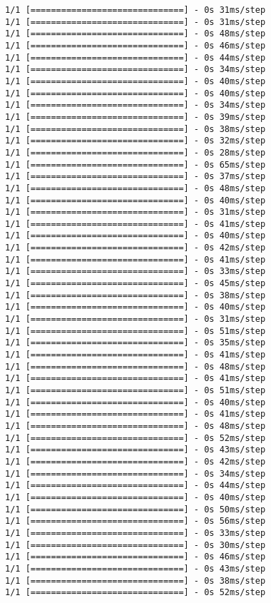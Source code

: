 \documentclass[11pt]{article}
\begin{document}
\begin{Verbatim}[commandchars=\\\{\}]
1/1 [==============================] - 0s 31ms/step
1/1 [==============================] - 0s 31ms/step
1/1 [==============================] - 0s 48ms/step
1/1 [==============================] - 0s 46ms/step
1/1 [==============================] - 0s 44ms/step
1/1 [==============================] - 0s 34ms/step
1/1 [==============================] - 0s 40ms/step
1/1 [==============================] - 0s 40ms/step
1/1 [==============================] - 0s 34ms/step
1/1 [==============================] - 0s 39ms/step
1/1 [==============================] - 0s 38ms/step
1/1 [==============================] - 0s 32ms/step
1/1 [==============================] - 0s 28ms/step
1/1 [==============================] - 0s 65ms/step
1/1 [==============================] - 0s 37ms/step
1/1 [==============================] - 0s 48ms/step
1/1 [==============================] - 0s 40ms/step
1/1 [==============================] - 0s 31ms/step
1/1 [==============================] - 0s 41ms/step
1/1 [==============================] - 0s 40ms/step
1/1 [==============================] - 0s 42ms/step
1/1 [==============================] - 0s 41ms/step
1/1 [==============================] - 0s 33ms/step
1/1 [==============================] - 0s 45ms/step
1/1 [==============================] - 0s 38ms/step
1/1 [==============================] - 0s 40ms/step
1/1 [==============================] - 0s 31ms/step
1/1 [==============================] - 0s 51ms/step
1/1 [==============================] - 0s 35ms/step
1/1 [==============================] - 0s 41ms/step
1/1 [==============================] - 0s 48ms/step
1/1 [==============================] - 0s 41ms/step
1/1 [==============================] - 0s 51ms/step
1/1 [==============================] - 0s 40ms/step
1/1 [==============================] - 0s 41ms/step
1/1 [==============================] - 0s 48ms/step
1/1 [==============================] - 0s 52ms/step
1/1 [==============================] - 0s 43ms/step
1/1 [==============================] - 0s 42ms/step
1/1 [==============================] - 0s 34ms/step
1/1 [==============================] - 0s 44ms/step
1/1 [==============================] - 0s 40ms/step
1/1 [==============================] - 0s 50ms/step
1/1 [==============================] - 0s 56ms/step
1/1 [==============================] - 0s 33ms/step
1/1 [==============================] - 0s 30ms/step
1/1 [==============================] - 0s 46ms/step
1/1 [==============================] - 0s 43ms/step
1/1 [==============================] - 0s 38ms/step
1/1 [==============================] - 0s 52ms/step

\end{Verbatim}
\end{document}
